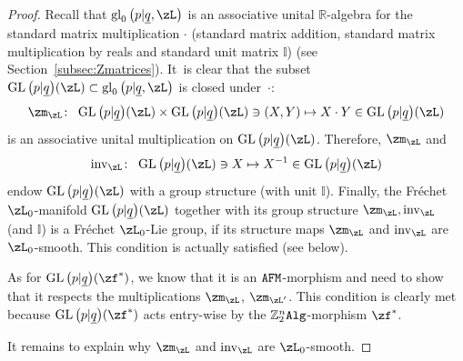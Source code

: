 \documentclass[pdftex]{sigma}%
\newcommand{\op}[1]{\operatorname{#1}}
\newcommand{\R}{{\mathbb R}}
\newcommand{\Z}{{\mathbb Z}}
\def\ul{\underline}
\def\ul{\underline}
\newcommand{\0}{\otimes}
\newcommand{\z}{\Z_2^n}
\numberwithin{equation}{section}
\begin{document}
\begin{proof}
Recall that $\op{gl}_0\big(p|\ul q,\zL\big)$ is an associative unital $\R$-algebra for the standard matrix multiplication $\cdot$ (standard matrix addition, standard matrix multiplication by reals and standard unit matrix $\mathbb{I}$) (see Section~\ref{subsec:Zmatrices}). It~is clear that the subset $\op{GL}\big(p|\ul q\big)(\zL)\subset\op{gl}_0\big(p|\ul q,\zL\big)$ is closed under~$\cdot$:
\begin{gather}\label{MultGL}
\zm_\zL\colon\ \op{GL}\big(p|\ul q\big)(\zL)\times\op{GL}\big(p|\ul q\big)(\zL)\ni(X,Y)\mapsto X\cdot Y\in\op{GL}\big(p|\ul q\big)(\zL)
\end{gather}
is an associative unital multiplication on $\op{GL}\big(p|\ul q\big)(\zL)$. Therefore, $\zm_\zL$ and
\begin{gather}\label{InvGL}
\op{inv}_\zL\colon\ \op{GL}\big(p|\ul q\big)(\zL)\ni X\mapsto X^{-1}\in \op{GL}\big(p|\ul q\big)(\zL)
\end{gather}
endow $\op{GL}\big(p|\ul q\big)(\zL)$ with a group structure (with unit $\mathbb{I}$). Finally, the Fr\'echet $\zL_0$-manifold $\mathop{\rm GL}\big(p|\ul q\big)(\zL)$ together with its group structure $\zm_\zL,\op{inv}_\zL$ (and $\mathbb{I}$) is a Fr\'echet $\zL_0$-Lie group, if its structure maps $\zm_\zL$ and $\op{inv}_\zL$ are $\zL_0$-smooth. This condition is actually satisfied (see below).

As for $\op{GL}\big(p|\ul q\big)(\zf^*)$, we know that it is an ${\tt AFM}$-morphism and need to show that it respects the multiplications $\zm_\zL$, $\zm_{\zL'}$. This condition is clearly met because $\op{GL}\big(p|\ul q\big)(\zf^*)$ acts entry-wise by the $\z{\tt Alg}$-morphism $\zf^*$.

It remains to explain why $\zm_\zL$ and $\op{inv}_\zL$ are $\zL_0$-smooth.


\end{proof}
\end{document}
